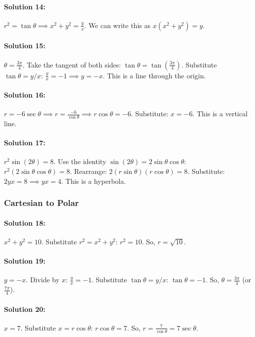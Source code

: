 \documentclass{article}
\begin{document}
\paragraph{Solution 14:} $r^2 = \tan\theta \implies x^2+y^2 = \frac{y}{x}$. We can write this as $x(x^2+y^2) = y$.

\paragraph{Solution 15:} $\theta = \frac{3\pi}{4}$. Take the tangent of both sides: $\tan\theta = \tan(\frac{3\pi}{4})$. Substitute $\tan\theta = y/x$: $\frac{y}{x} = -1 \implies y = -x$. This is a line through the origin.

\paragraph{Solution 16:} $r = -6\sec\theta \implies r = \frac{-6}{\cos\theta} \implies r\cos\theta = -6$. Substitute: $x = -6$. This is a vertical line.

\paragraph{Solution 17:} $r^2\sin(2\theta) = 8$. Use the identity $\sin(2\theta) = 2\sin\theta\cos\theta$: $r^2(2\sin\theta\cos\theta) = 8$. Rearrange: $2(r\sin\theta)(r\cos\theta) = 8$. Substitute: $2yx = 8 \implies yx=4$. This is a hyperbola.

\subsubsection*{Cartesian to Polar}
\paragraph{Solution 18:} $x^2 + y^2 = 10$. Substitute $r^2 = x^2+y^2$: $r^2 = 10$. So, $r = \sqrt{10}$.

\paragraph{Solution 19:} $y = -x$. Divide by $x$: $\frac{y}{x} = -1$. Substitute $\tan\theta = y/x$: $\tan\theta = -1$. So, $\theta = \frac{3\pi}{4}$ (or $\frac{7\pi}{4}$).

\paragraph{Solution 20:} $x=7$. Substitute $x = r\cos\theta$: $r\cos\theta = 7$. So, $r = \frac{7}{\cos\theta} = 7\sec\theta$.
\end{document}

